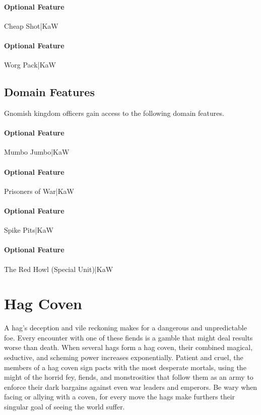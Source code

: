 \documentclass[10pt,a4paper,twoside,bg=print,twocolumn,openany,nodeprecatedcode]{dndbook}
\begin{document}
\paragraph{Optional Feature}
Cheap Shot|KaW

\paragraph{Optional Feature}
Worg Pack|KaW

\subsection{Domain Features}
Gnomish kingdom officers gain access to the following domain features.

\paragraph{Optional Feature}
Mumbo Jumbo|KaW

\paragraph{Optional Feature}
Prisoners of War|KaW

\paragraph{Optional Feature}
Spike Pits|KaW

\paragraph{Optional Feature}
The Red Howl (Special Unit)|KaW

\section{Hag Coven}
A hag's deception and vile reckoning makes for a dangerous and unpredictable foe. Every encounter with one of these fiends is a gamble that might deal results worse than death. When several hags form a hag coven, their combined magical, seductive, and scheming power increases exponentially. Patient and cruel, the members of a hag coven sign pacts with the most desperate mortals, using the might of the horrid fey, fiends, and monstrosities that follow them as an army to enforce their dark bargains against even war leaders and emperors. Be wary when facing or allying with a coven, for every move the hags make furthers their singular goal of seeing the world suffer.
\end{document}
